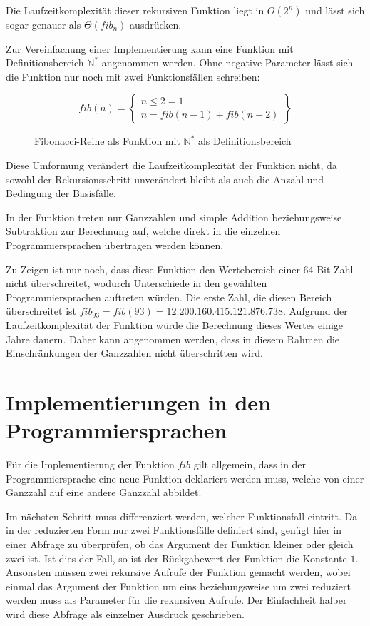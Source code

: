 \documentclass[11pt, parskip=half]{scrartcl}       %
\newcommand*{\N}{\mathbb{N}}
\begin{document}
Die Laufzeitkomplexität dieser rekursiven Funktion liegt in $O(2^{n})$ und lässt sich sogar genauer als $\Theta(fib_{n})$ ausdrücken.

Zur Vereinfachung einer Implementierung kann eine Funktion mit Definitionsbereich $\N^*$ angenommen werden. Ohne negative Parameter lässt sich die Funktion nur noch mit zwei Funktionsfällen schreiben:
\begin{figure}[h]
  \centering
$$
fib (n) = \left.
  \begin{cases}
    n \leq 2 = 1 \\
    n = fib(n-1) + fib(n-2)
  \end{cases}
\right\}
$$  
  \caption{Fibonacci-Reihe als Funktion mit $\N^*$ als Definitionsbereich}
  \label{fig:fib2}
\end{figure}

Diese Umformung verändert die Laufzeitkomplexität der Funktion nicht, da sowohl der Rekursionsschritt unverändert bleibt als auch die Anzahl und Bedingung der Basisfälle.

In der Funktion treten nur Ganzzahlen und simple Addition beziehungsweise Subtraktion zur Berechnung auf, welche direkt in die einzelnen Programmiersprachen übertragen werden können.

Zu Zeigen ist nur noch, dass diese Funktion den Wertebereich einer 64-Bit Zahl nicht überschreitet, wodurch Unterschiede in den gewählten Programmiersprachen auftreten würden. Die erste Zahl, die diesen Bereich überschreitet ist $fib_{93} = fib(93) = 12.200.160.415.121.876.738$. Aufgrund der Laufzeitkomplexität der Funktion würde die Berechnung dieses Wertes einige Jahre dauern. Daher kann angenommen werden, dass in diesem Rahmen die Einschränkungen der Ganzzahlen nicht überschritten wird. 

\section{Implementierungen in den Programmiersprachen}

Für die Implementierung der Funktion $fib$ gilt allgemein, dass in der Programmiersprache eine neue Funktion deklariert werden muss, welche von einer Ganzzahl auf eine andere Ganzzahl abbildet.

Im nächsten Schritt muss differenziert werden, welcher Funktionsfall eintritt.
Da in der reduzierten Form nur zwei Funktionsfälle definiert sind, genügt hier in einer Abfrage zu überprüfen, ob  das Argument der Funktion kleiner oder gleich zwei ist.
Ist dies der Fall, so ist der Rückgabewert der Funktion die Konstante $1$.
Ansonsten müssen zwei rekursive Aufrufe der Funktion gemacht werden, wobei einmal das Argument der Funktion um eins beziehungsweise um zwei reduziert werden muss als Parameter für die rekursiven Aufrufe.
Der Einfachheit halber wird diese Abfrage als einzelner Ausdruck geschrieben.
\end{document}
